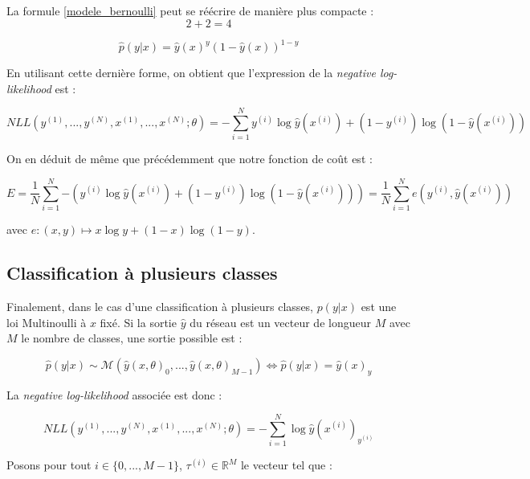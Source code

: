 \documentclass{report}
\begin{document}
La formule \ref{modele_bernoulli} peut se réécrire de manière plus compacte :
\[
2+2=4
\]

\begin{equation}
\hat{p}(y|x) = \hat{y}(x)^y(1-\hat{y}(x))^{1-y}
\label{modele_bernoulli_compact}
\end{equation}

En utilisant cette dernière forme, on obtient que l'expression de la \textit{negative log-likelihood} est : 

\begin{equation}
NLL(y^{(1)}, ..., y^{(N)}, x^{(1)}, ..., x^{(N)}; \theta) = -\sum_{i=1}^{N}{y^{(i)}\log\hat{y}(x^{(i)})+(1-y^{(i)})\log(1-\hat{y}(x^{(i)}))}
\end{equation}

On en déduit de même que précédemment que notre fonction de coût est :

\begin{equation}
E = \frac{1}{N}\sum_{i=1}^{N}{-(y^{(i)}\log\hat{y}(x^{(i)})+(1-y^{(i)})\log(1-\hat{y}(x^{(i)})))} = \frac{1}{N}\sum_{i=1}^{N}{e(y^{(i)}, \hat{y}(x^{(i)}))}
\end{equation}

avec $e : (x, y) \mapsto x \log y + (1-x)\log(1-y)$.

\subsection{Classification à plusieurs classes}

Finalement, dans le cas d'une classification à plusieurs classes, $p(y|x)$ est une loi Multinoulli à $x$ fixé. Si la sortie $\hat{y}$ du réseau est un vecteur de longueur $M$ avec $M$ le nombre de classes, une sortie possible est :

\begin{equation}
\hat{p}(y|x) \sim \mathcal{M}(\hat{y}(x, \theta)_0, ..., \hat{y}(x, \theta)_{M-1}) \Leftrightarrow \hat{p}(y|x) = \hat{y}(x)_y
\label{modele_multinoulli}
\end{equation}

La \textit{negative log-likelihood} associée est donc :

\begin{equation}
NLL(y^{(1)}, ..., y^{(N)}, x^{(1)}, ..., x^{(N)}; \theta) = -\sum_{i=1}^{N}{\log \hat{y}(x^{(i)})_{y^{(i)}}}
\label{NLL_multinoulli}
\end{equation}

Posons pour tout $i \in \{0, ..., M-1\}$, $\tau^{(i)} \in \mathbb{R}^M$ le vecteur tel que :
\end{document}
